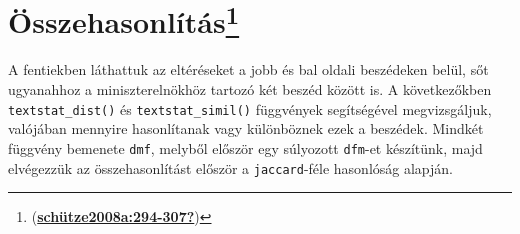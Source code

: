 \documentclass[
]{book}
\begin{document}
\hypertarget{uxf6sszehasonluxedtuxe1s4}{%
\section[Összehasonlítás]{\texorpdfstring{Összehasonlítás\footnote{(\protect\hyperlink{ref-schuxfctze2008a:294-307}{\textbf{schütze2008a:294-307?}})}}{Összehasonlítás}}\label{uxf6sszehasonluxedtuxe1s4}}

A fentiekben láthattuk az eltéréseket a jobb és bal oldali beszédeken
belül, sőt ugyanahhoz a miniszterelnökhöz tartozó két beszéd között is.
A következőkben \texttt{textstat\_dist()} és \texttt{textstat\_simil()}
függvények segítségével megvizsgáljuk, valójában mennyire hasonlítanak
vagy különböznek ezek a beszédek. Mindkét függvény bemenete
\texttt{dmf}, melyből először egy súlyozott \texttt{dfm}-et készítünk,
majd elvégezzük az összehasonlítást először a \texttt{jaccard}-féle
hasonlóság alapján.
\end{document}
